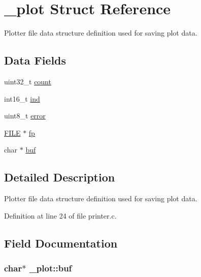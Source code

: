 \hypertarget{struct__plot}{}\section{\+\_\+plot Struct Reference}
\label{struct__plot}


Plotter file data structure definition used for saving plot data.  


\subsection*{Data Fields}
\begin{DoxyCompactItemize}
\item 
uint32\+\_\+t \hyperlink{struct__plot_af4d84e2aa52eabdc7ccc2fbf18272e98}{count}
\item 
int16\+\_\+t \hyperlink{struct__plot_ab02a041a2c701b09447d883089abba4f}{ind}
\item 
uint8\+\_\+t \hyperlink{struct__plot_a9a9516230fefbc6cdd6e4ca5d6403509}{error}
\item 
\hyperlink{posix_8h_aed4dabeb9f7c518ded42f930a04abce8}{F\+I\+LE} $\ast$ \hyperlink{struct__plot_aec1bc5aae9d9c56584ee0cbb31515ac6}{fp}
\item 
char $\ast$ \hyperlink{struct__plot_ad7907cd2e279a361e68160bae8106ae4}{buf}
\end{DoxyCompactItemize}


\subsection{Detailed Description}
Plotter file data structure definition used for saving plot data. 

Definition at line 24 of file printer.\+c.



\subsection{Field Documentation}
\subsubsection[{\texorpdfstring{buf}{buf}}]{\setlength{\rightskip}{0pt plus 5cm}char$\ast$ \+\_\+plot\+::buf}\hypertarget{struct__plot_ad7907cd2e279a361e68160bae8106ae4}{}\label{struct__plot_ad7907cd2e279a361e68160bae8106ae4}


